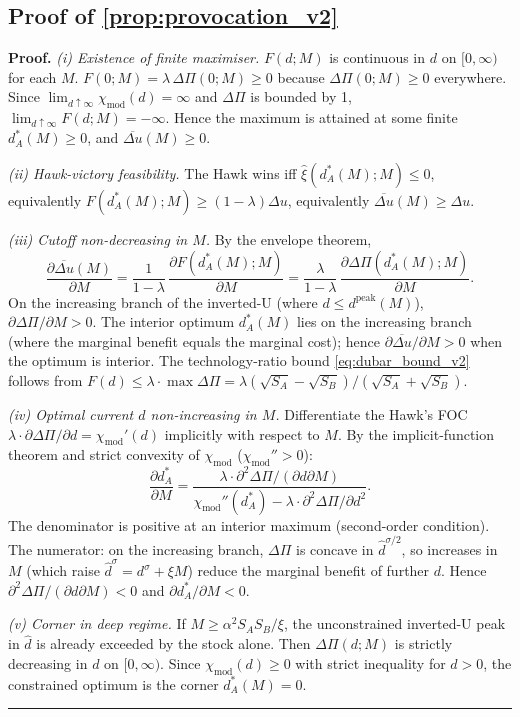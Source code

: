 \documentclass[11pt,twoside]{extarticle}
\newenvironment{proof}[1][Proof]{\noindent \textbf{#1.} }{\ \rule{0.5em}{0.5em}}
\begin{document}
\subsection*{Proof of \autoref{prop:provocation_v2}} \label{app:proof:provocation_v2}

\begin{proof}
\textit{(i) Existence of finite maximiser.} $F(d; M)$ is continuous in $d$
on $[0, \infty)$ for each $M$. $F(0; M) = \lambda\,\Delta\Pi(0; M) \ge 0$
because $\Delta\Pi(0; M) \ge 0$ everywhere. Since
$\lim_{d\uparrow\infty}\chi_{\mathrm{mod}}(d) = \infty$ and $\Delta\Pi$ is
bounded by 1, $\lim_{d\uparrow\infty}F(d; M) = -\infty$. Hence the
maximum is attained at some finite $d_A^*(M) \ge 0$, and
$\overline{\Delta u}(M) \ge 0$.

\textit{(ii) Hawk-victory feasibility.} The Hawk wins iff
$\hat\xi(d_A^*(M); M) \le 0$, equivalently $F(d_A^*(M); M) \ge (1-\lambda)\Delta u$,
equivalently $\overline{\Delta u}(M) \ge \Delta u$.

\textit{(iii) Cutoff non-decreasing in $M$.} By the envelope theorem,
\[
\frac{\partial \overline{\Delta u}(M)}{\partial M}
= \frac{1}{1-\lambda}\,\frac{\partial F(d_A^*(M); M)}{\partial M}
= \frac{\lambda}{1-\lambda}\,\frac{\partial \Delta\Pi(d_A^*(M); M)}{\partial M}.
\]
On the increasing branch of the inverted-U (where $d \le d^{\mathrm{peak}}(M)$),
$\partial \Delta\Pi / \partial M > 0$. The interior optimum $d_A^*(M)$
lies on the increasing branch (where the marginal benefit equals the
marginal cost); hence $\partial \overline{\Delta u} / \partial M > 0$
when the optimum is interior. The technology-ratio bound \autoref{eq:dubar_bound_v2}
follows from $F(d) \le \lambda \cdot \max\Delta\Pi = \lambda(\sqrt{S_A} - \sqrt{S_B})/(\sqrt{S_A} + \sqrt{S_B})$.

\textit{(iv) Optimal current $d$ non-increasing in $M$.} Differentiate the
Hawk's FOC $\lambda \cdot \partial \Delta\Pi / \partial d = \chi_{\mathrm{mod}}'(d)$
implicitly with respect to $M$. By the implicit-function theorem and
strict convexity of $\chi_{\mathrm{mod}}$ ($\chi_{\mathrm{mod}}'' > 0$):
\[
\frac{\partial d_A^*}{\partial M}
= \frac{\lambda \cdot \partial^2 \Delta\Pi / (\partial d \partial M)}{\chi_{\mathrm{mod}}''(d_A^*) - \lambda \cdot \partial^2 \Delta\Pi / \partial d^2}.
\]
The denominator is positive at an interior maximum (second-order condition).
The numerator: on the increasing branch, $\Delta\Pi$ is concave in
$\hat d^{\sigma/2}$, so increases in $M$ (which raise $\hat d^\sigma = d^\sigma + \xi M$)
reduce the marginal benefit of further $d$. Hence $\partial^2 \Delta\Pi / (\partial d \partial M) < 0$
and $\partial d_A^* / \partial M < 0$.

\textit{(v) Corner in deep regime.} If $M \ge \alpha^2 S_A S_B / \xi$, the
unconstrained inverted-U peak in $\hat d$ is already exceeded by the stock
alone. Then $\Delta\Pi(d; M)$ is strictly decreasing in $d$ on $[0, \infty)$.
Since $\chi_{\mathrm{mod}}(d) \ge 0$ with strict inequality for $d > 0$, the
constrained optimum is the corner $d_A^*(M) = 0$.
\end{proof}
\end{document}

